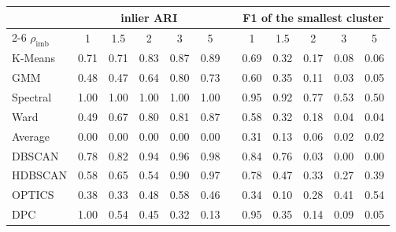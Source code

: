 \begin{tabular}{@{}lccccccccccc@{}}
\toprule
 & \multicolumn{5}{c}{inlier ARI} & & \multicolumn{5}{c}{F1 of the smallest cluster} \\
\cmidrule{2-6}\cmidrule{8-12}
$\rho_{\text{imb}}$ & 1 & 1.5 & 2 & 3 & 5 & & 1 & 1.5 & 2 & 3 & 5 \\
\midrule
K-Means & 0.71 & 0.71 & 0.83 & 0.87 & 0.89 & & 0.69 & 0.32 & 0.17 & 0.08 & 0.06 \\
GMM & 0.48 & 0.47 & 0.64 & 0.80 & 0.73 & & 0.60 & 0.35 & 0.11 & 0.03 & 0.05 \\
Spectral & 1.00 & 1.00 & 1.00 & 1.00 & 1.00 & & 0.95 & 0.92 & 0.77 & 0.53 & 0.50 \\
Ward & 0.49 & 0.67 & 0.80 & 0.81 & 0.87 & & 0.58 & 0.32 & 0.18 & 0.04 & 0.04 \\
Average & 0.00 & 0.00 & 0.00 & 0.00 & 0.00 & & 0.31 & 0.13 & 0.06 & 0.02 & 0.02 \\
DBSCAN & 0.78 & 0.82 & 0.94 & 0.96 & 0.98 & & 0.84 & 0.76 & 0.03 & 0.00 & 0.00 \\
HDBSCAN & 0.58 & 0.65 & 0.54 & 0.90 & 0.97 & & 0.78 & 0.47 & 0.33 & 0.27 & 0.39 \\
OPTICS & 0.38 & 0.33 & 0.48 & 0.58 & 0.46 & & 0.34 & 0.10 & 0.28 & 0.41 & 0.54 \\
DPC & 1.00 & 0.54 & 0.45 & 0.32 & 0.13 & & 0.95 & 0.35 & 0.14 & 0.09 & 0.05 \\
\bottomrule
\end{tabular}
